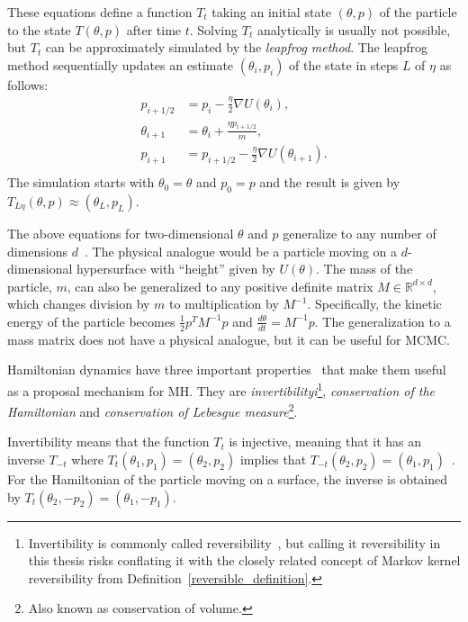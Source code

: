\documentclass[english,twoside,openright]{HYgraduMLDS}
\newcommand{\R}{\mathbb{R}}
\begin{document}
These equations define a function \(T_t\) taking an initial state 
\((\theta, p)\) of the particle to the state \(T(\theta, p)\) after time \(t\).
Solving \(T_t\) analytically is usually not possible, but \(T_t\) can be 
approximately simulated by the \emph{leapfrog method}. The leapfrog method sequentially
updates an estimate \((\theta_i, p_i)\) of the state in steps \(L\) of \(\eta\) 
as follows:
\begin{align*}
    p_{i+1/2} &= p_i - \frac{\eta}{2}\nabla U(\theta_i), \\
    \theta_{i+1} &= \theta_i + \frac{\eta p_{i+1/2}}{m}, \\
    p_{i+1} &= p_{i+1/2} - \frac{\eta}{2}\nabla U(\theta_{i+1}). \\
\end{align*}
The simulation starts with \(\theta_0 = \theta\) and \(p_0 = p\) and the 
result is given by \(T_{L\eta}(\theta, p) \approx (\theta_L, p_L)\).

The above equations for two-dimensional \(\theta\) and \(p\) generalize to
any number of dimensions \(d\)~\cite{neal2012mcmc}. The physical analogue would be a particle moving
on a \(d\)-dimensional hypersurface with ``height'' given by \(U(\theta)\).
The mass of the particle, \(m\), can also be generalized to any positive
definite matrix \(M \in \R^{d\times d}\), which changes division by
\(m\) to multiplication by \(M^{-1}\). Specifically, the kinetic energy of the
particle becomes \(\frac{1}{2}p^{T}M^{-1}p\) and
\(\frac{d\theta}{dt} = M^{-1}p\). The generalization to a mass matrix does not
have a physical analogue, but it can be useful for MCMC.

Hamiltonian dynamics have three important properties~\cite{neal2012mcmc} 
that make them useful as a
proposal mechanism for MH. They are \emph{invertibilityi}\footnote{
  Invertibility is commonly called reversibility~\cite{neal2012mcmc}, but
  calling it reversibility in this thesis risks conflating it with
  the closely related concept of Markov kernel reversibility from
  Definition~\ref{reversible_definition}.
},
\emph{conservation of the Hamiltonian} and
\emph{conservation of Lebesgue measure}\footnote{Also
  known as conservation of volume.
}.

Invertibility means that the function \(T_t\) is injective, meaning that
it has an inverse \(T_{-t}\) where \(T_t(\theta_1, p_1) = (\theta_2, p_2)\)
implies that \(T_{-t}(\theta_2, p_2) = (\theta_1, p_1)\)~\cite{neal2012mcmc}.
For the Hamiltonian of the particle moving on a surface, the inverse 
is obtained by \(T_t(\theta_2, -p_2) = (\theta_1, -p_1)\).
\end{document}
